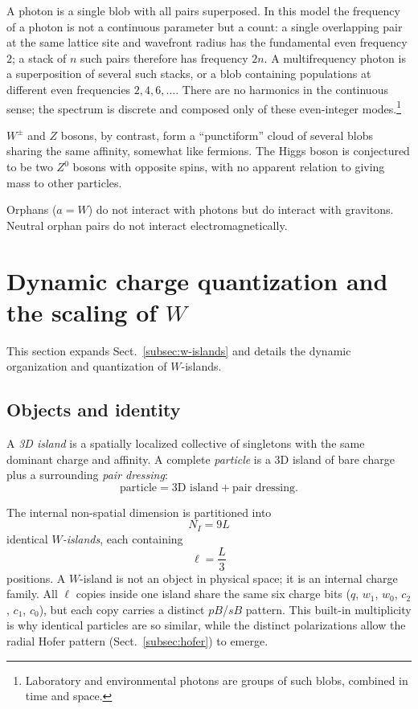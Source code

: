 \documentclass{ijuc}
\begin{document}
A photon is a single blob with all pairs superposed. In this model the frequency of a photon is not a continuous parameter but a count: a single overlapping pair at the same lattice site and wavefront radius has the fundamental even frequency $2$; a stack of $n$ such pairs therefore has frequency $2n$. A multifrequency photon is a superposition of several such stacks, or a blob containing populations at different even frequencies $2,4,6,\dots$. There are no harmonics in the continuous sense; the spectrum is discrete and composed only of these even-integer modes.\footnote{Laboratory and environmental photons are groups of such blobs, combined in time and space.}

$W^{\pm}$ and $Z$ bosons, by contrast, form a ``punctiform'' cloud of several blobs sharing the same affinity, somewhat like fermions. The Higgs boson is conjectured to be two $Z^0$ bosons with opposite spins, with no apparent relation to giving mass to other particles.

Orphans ($a=W$) do not interact with photons but do interact with gravitons. Neutral orphan pairs do not interact electromagnetically.


\section{Dynamic charge quantization and the scaling of $W$}\label{sec:dynamic-charge-quantization}

This section expands Sect.~\ref{subsec:w-islands} and details the dynamic organization and quantization of $W$-islands.

\subsection{Objects and identity}

A \emph{3D island} is a spatially localized collective of singletons with the same dominant charge and affinity. A complete \emph{particle} is a 3D island of bare charge plus a surrounding \emph{pair dressing}:
\begin{equation}
\text{particle} = \text{3D island} + \text{pair dressing}.
\end{equation}

The internal non-spatial dimension is partitioned into
\begin{equation}
N_I = 9L
\end{equation}
identical \emph{$W$-islands}, each containing
\begin{equation}
\ell = \frac{L}{3}
\end{equation}
positions. A $W$-island is not an object in physical space; it is an internal charge family. All $\ell$ copies inside one island share the same six charge bits ($q$, $w_1$, $w_0$, $c_2$, $c_1$, $c_0$), but each copy carries a distinct $pB$/$sB$ pattern. This built-in multiplicity is why identical particles are so similar, while the distinct polarizations allow the radial Hofer pattern (Sect.~\ref{subsec:hofer}) to emerge.
\end{document}
